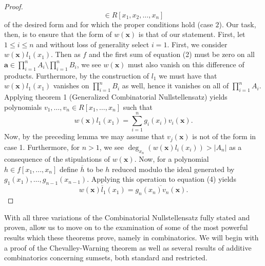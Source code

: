 \begin{proof}[Proof]
\[\in R[x_1, x_2, \ldots, x_{n}]\] of the desired form and for which the
	proper conditions hold (case $2$). Our task, then, is to ensure that
	the form of $w\left( \textbf{x} \right)$ is that of our statement.
	First, let $1 \le i \le n$ and without loss of generality select $i
	=1$. First, we consider $w\left( \textbf{x} \right) l_1\left( x_1
	\right) $. Then as $f$ and the first sum of equation (2) must be zero
	on all $\textbf{a}\in \prod_{i= 1}^{n} A_{i} \setminus \prod_{i= 1}^{n}
	B_{i}$, we see $w\left( \textbf{x} \right) $ must also vanish on this
	difference of products. Furthermore, by the construction of $l_1$ we
	must have that $w\left( \textbf{x} \right) l_1 \left( x_1 \right) $
	vanishes on $\prod_{i= 1}^{n} B_{i}$ as well, hence it vanishes on all
	of $\prod_{i= 1}^{n} A_{i}$. Applying theorem 1 (Generalized
	Combinatorial Nullstellensatz) yields polynomials $v_1, \ldots, v_{n}
	\in R[x_1, \ldots, x_{n}]$ such that \begin{equation} w\left(
		\textbf{x} \right) l_1 \left( x_1 \right) = \sum_{i= 1}^{n}
		g_{i} \left( x_{i} \right) v_{i} \left( \textbf{x} \right)
		.\end{equation} Now, by the preceding lemma we may assume that
		$v_{j} \left( \textbf{x} \right) $ is not of the form in case
		1. Furthermore, for $n>1$, we see $\deg _{x_{n}} \left( w
		\left( \textbf{x} \right) l_{i} \left( x_{i} \right)  \right) >
		\left| A_{n} \right| $ as a consequence of the stipulations of
		$w\left( \textbf{x} \right) $. Now, for a polynomial $h \in
		f[x_1, ..., x_{n}]$ define $\overline{h}$ to be $h$ reduced
		modulo the ideal generated by $g_1 \left( x_1 \right) , \ldots,
		g_{n-1}\left( x_{n-1} \right) $. Applying this operation to
		equation (4) yields  \[ \overline{w\left( \textbf{x} \right)
		l_{1} \left( x_1 \right) } = \overline{g_{n}\left( x_{n}
\right) v_{n} \left( \textbf{x} \right) } .\]  \end{proof} With all three variations of the Combinatorial
Nullstellensatz fully stated and proven, allow us to move on to the examination
of some of the most powerful results which these theorems prove, namely in
combinatorics. We will begin with a proof of the Chevalley-Warning theorem as
well as several results of additive combinatorics concerning sumsets, both
standard and restricted.  
